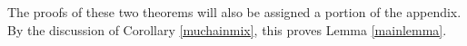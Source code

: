 \documentclass[12pt]{amsart}
\theoremstyle{definition}
\theoremstyle{remark}
\numberwithin{equation}{section}
\theoremstyle{remark}
\begin{document}
The proofs of these two theorems will also be assigned a portion of the appendix.
By the discussion of Corollary \ref{muchainmix}, this proves Lemma \ref{mainlemma}.








\end{document}
